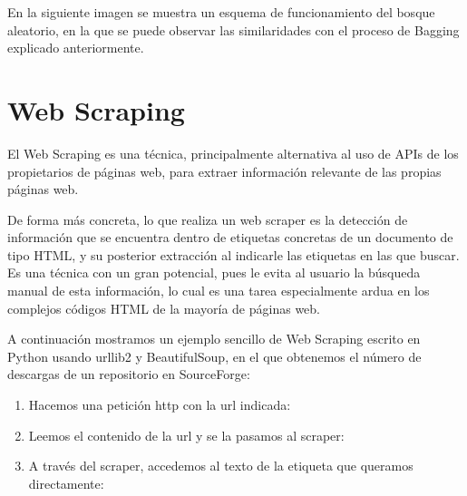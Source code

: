 En la siguiente imagen se muestra un esquema de funcionamiento del bosque aleatorio, en la que se puede observar las similaridades con el proceso de Bagging explicado anteriormente.




\section{Web Scraping}

El Web Scraping \cite{mitchell2015web} es una técnica, principalmente alternativa al uso de APIs de los propietarios de páginas web, para extraer información relevante de las propias páginas web.

De forma más concreta, lo que realiza un web scraper es la detección de información que se encuentra dentro de etiquetas concretas de un documento de tipo HTML, y su posterior extracción al indicarle las etiquetas en las que buscar. Es una técnica con un gran potencial, pues le evita al usuario la búsqueda manual de esta información, lo cual es una tarea especialmente ardua en los complejos códigos HTML de la mayoría de páginas web. 

A continuación mostramos un ejemplo sencillo de Web Scraping escrito en Python usando urllib2 y BeautifulSoup, en el que obtenemos el número de descargas de un repositorio en SourceForge:

\begin{enumerate}

\item Hacemos una petición http con la url indicada:


\item Leemos el contenido de la url y se la pasamos al scraper:


\item A través del scraper, accedemos al texto de la etiqueta que queramos directamente:


\end{enumerate}



